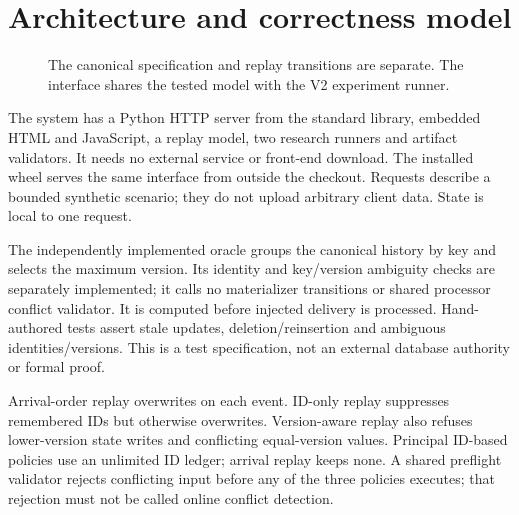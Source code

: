 \documentclass[sigconf,9pt]{acmart}
\begin{document}
\section{Architecture and correctness model}
\begin{figure}[t]
\centering
{}
\caption{The canonical specification and replay transitions are separate. The interface
shares the tested model with the V2 experiment runner.}
\label{fig:architecture}
\end{figure}
The system has a Python HTTP server from the standard library, embedded HTML and JavaScript,
a replay model, two research runners and artifact validators. It needs no external
service or front-end download. The installed wheel serves the same interface from
outside the checkout. Requests describe a bounded synthetic scenario; they do not
upload arbitrary client data. State is local to one request.

The independently implemented oracle groups the canonical history by key and selects the maximum
version. Its identity and key/version ambiguity checks are separately implemented;
it calls no materializer transitions or shared processor conflict validator. It is
computed before injected delivery is processed. Hand-authored tests assert stale
updates, deletion/reinsertion and ambiguous identities/versions. This is a test
specification, not an external database authority or formal proof.

Arrival-order replay overwrites on each event. ID-only replay suppresses remembered
IDs but otherwise overwrites. Version-aware replay also refuses lower-version state
writes and conflicting equal-version values. Principal ID-based policies use an unlimited ID ledger; arrival replay keeps none. A shared preflight validator rejects conflicting input before any of the
three policies executes; that rejection must not be called online conflict detection.
\end{document}
